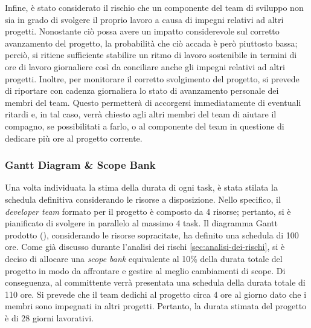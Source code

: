 Infine, è stato considerato il rischio che un componente del team di sviluppo non sia in grado di svolgere il proprio lavoro a causa di impegni relativi ad altri progetti.
Nonostante ciò possa avere un impatto considerevole sul corretto avanzamento del progetto, la probabilità che ciò accada è però piuttosto bassa; perciò, si ritiene sufficiente stabilire un ritmo di lavoro sostenibile in termini di ore di lavoro giornaliere così da conciliare anche gli impegni relativi ad altri progetti.
Inoltre, per monitorare il corretto svolgimento del progetto, si prevede di riportare con cadenza giornaliera lo stato di avanzamento personale dei membri del team.
Questo permetterà di accorgersi immediatamente di eventuali ritardi e, in tal caso, verrà chiesto agli altri membri del team di aiutare il compagno, se possibilitati a farlo, o al componente del team in questione di dedicare più ore al progetto corrente.

\subsubsection{Gantt Diagram \& Scope Bank}
Una volta individuata la stima della durata di ogni task, è stata stilata la schedula definitiva considerando le risorse a disposizione.
Nello specifico, il \textit{developer team} formato per il progetto è composto da 4 risorse; pertanto, si è pianificato di svolgere in parallelo al massimo 4 task.
Il diagramma Gantt prodotto (), considerando le risorse sopracitate, ha definito una schedula di 100 ore.
Come già discusso durante l'analisi dei rischi \ref{sec:analisi-dei-rischi}, si è deciso di allocare una \textit{scope bank} equivalente al 10\% della durata totale del progetto in modo da affrontare e gestire al meglio cambiamenti di scope.
Di conseguenza, al committente verrà presentata una schedula della durata totale di 110 ore.
Si prevede che il team dedichi al progetto circa 4 ore al giorno dato che i membri sono impegnati in altri progetti.
Pertanto, la durata stimata del progetto è di 28 giorni lavorativi.
